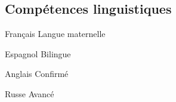 \documentclass[30pt, french]{tccv}
\begin{document}
\begin{upshape}
\begin{education}
\end{education}


%
%


\begin{competence}


\section{Compétences linguistiques}
\fontsize{15pt}{1.6em}\color{text}\bodyfontlight\upshape\selectfont %
\begin{factlist}
\item{Français} {Langue maternelle}	
\item{Espagnol} {Bilingue}	
\item{Anglais} {Confirmé}	
\item{Russe} {Avancé}
\end{factlist}

\fontsize{10pt}{1.1em}\color{text}\bodyfontlight\upshape\selectfont %






\end{competence}




%
%


\begin{experience}


\end{experience}
\end{upshape}
\end{document}
